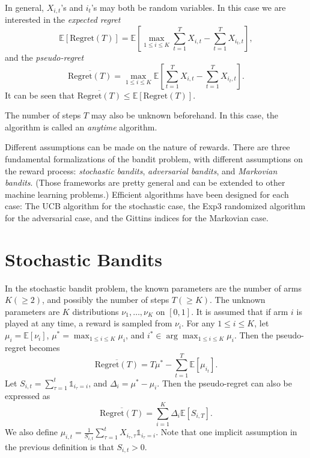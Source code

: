 \documentclass[openany]{book}
\theoremstyle{definition}
\theoremstyle{remark}
\begin{document}
In general, $X_{i,t}$'s and $i_t$'s may both be random variables. In this case we are interested in the \emph{expected regret}
\begin{equation}\label{expectedRegret}
    \mathbb{E}[\mathrm{Regret}(T)]=\mathbb{E}\left[\max_{1\le i\le K}\sum_{t=1}^{T}X_{i,t}-\sum_{t=1}^{T}X_{i_t,t}\right],
\end{equation}
and the \emph{pseudo-regret}
\begin{equation}\label{pseudoRegret}
    \overline{\mathrm{Regret}(T)}=\max_{1\le i\le K}\mathbb{E}\left[\sum_{t=1}^{T}X_{i,t}-\sum_{t=1}^{T}X_{i_t,t}\right].
\end{equation}
It can be seen that $\overline{\mathrm{Regret}(T)}\le \mathbb{E}[\mathrm{Regret}(T)]$.

The number of steps $T$ may also be unknown beforehand. In this case, the algorithm is called an \emph{anytime} algorithm.

Different assumptions can be made on the nature of rewards. There are three fundamental formalizations of the bandit problem, with different assumptions on the reward process: \emph{stochastic bandits}, \emph{adversarial bandits}, and \emph{Markovian bandits}. (Those frameworks are pretty general and can be extended to other machine learning problems.) Efficient algorithms have been designed for each case: The UCB algorithm for the stochastic case, the Exp3 randomized algorithm for the adversarial case, and the Gittins indices for the Markovian case.

\chapter{Stochastic Bandits}
In the stochastic bandit problem, the known parameters are the number of arms $K(\ge2)$, and possibly the number of steps $T(\ge K)$. The unknown parameters are $K$ distributions $\nu_1,\ldots,\nu_K$ on $[0,1]$. It is assumed that if arm $i$ is played at any time, a reward is sampled from $\nu_i$. For any $1\le i\le K$, let $\mu_i=\mathbb{E}[\nu_i]$, $\mu^*=\max_{1\le i\le K}\mu_i$, and $i^*\in\arg\max_{1\le i\le K}\mu_i$. Then the pseudo-regret becomes
\begin{equation}\label{stochPseudoRegret}
    \overline{\mathrm{Regret}(T)}=T\mu^*-\sum_{t=1}^{T}\mathbb{E}[\mu_{i_t}].
\end{equation}
Let $S_{i,t}=\sum_{\tau=1}^{t}\mathds{1}_{i_{\tau}=i}$, and $\Delta_i=\mu^*-\mu_i$. Then the pseudo-regret can also be expressed as
\begin{equation}\label{stochPseudoRegretAlt}
    \overline{\mathrm{Regret}(T)}=\sum_{i=1}^{K}\Delta_i \mathbb{E}[S_{i,T}].
\end{equation}
We also define $\mu_{i,t}=\frac{1}{S_{i,t}}\sum_{\tau=1}^{t}X_{i_{\tau},\tau}\mathds{1}_{i_{\tau}=i}$. Note that one implicit assumption in the previous definition is that $S_{i,t}>0$.
\end{document}
